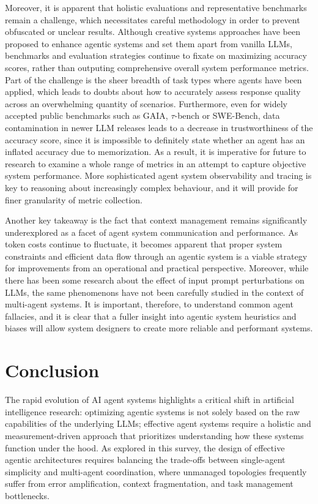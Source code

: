 \documentclass[conference]{IEEEtran}
\begin{document}
Moreover, it is apparent that holistic evaluations and representative benchmarks remain a challenge,
which necessitates careful methodology in order to prevent obfuscated or unclear results.
Although creative systems approaches have been proposed to enhance agentic systems and set them apart
from vanilla LLMs, benchmarks and evaluation strategies continue to fixate on maximizing accuracy
scores, rather than outputing comprehensive overall system performance metrics.
Part of the challenge is the sheer breadth of task types where agents have been applied, which leads
to doubts about how to accurately assess response quality across an overwhelming quantity of scenarios.
Furthermore, even for widely accepted public benchmarks such as GAIA, $\tau$-bench or SWE-Bench,
data contamination in newer LLM releases leads to a decrease in trustworthiness of the accuracy score,
since it is impossible to definitely state whether an agent has an inflated accuracy due to memorization.
As a result, it is imperative for future to research to examine a whole range of metrics in an
attempt to capture objective system performance.
More sophisticated agent system observability and tracing is key to reasoning about increasingly complex
behaviour, and it will provide for finer granularity of metric collection.

Another key takeaway is the fact that context management remains significantly underexplored as a
facet of agent system communication and performance.
As token costs continue to fluctuate, it becomes apparent that proper system constraints and
efficient data flow through an agentic system is a viable strategy for improvements from an
operational and practical perspective.
Moreover, while there has been some research about the effect of input prompt perturbations on LLMs,
the same phenomenons have not been carefully studied in the context of multi-agent systems.
It is important, therefore, to understand common agent fallacies, and it is clear that a fuller
insight into agentic system heuristics and biases will allow system designers to create more
reliable and performant systems.

\section{Conclusion}
The rapid evolution of AI agent systems highlights a critical shift in artificial intelligence research: 
optimizing agentic systems is not solely based on the raw capabilities of the underlying LLMs;
effective agent systems require a holistic and measurement-driven approach that prioritizes
understanding how these systems function under the hood.
As explored in this survey, the design of effective agentic architectures requires 
balancing the trade-offs between single-agent simplicity and multi-agent coordination, 
where unmanaged topologies frequently suffer from error amplification, context fragmentation, 
and task management bottlenecks.
\end{document}

